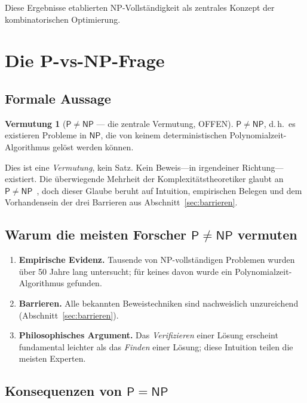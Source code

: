 \documentclass[12pt,a4paper]{amsart}
\theoremstyle{definition}
\newtheorem{conjecture}[theorem]{Vermutung}
\newcommand{\Pclass}{\mathsf{P}}
\newcommand{\NP}{\mathsf{NP}}
\begin{document}
Diese Ergebnisse etablierten NP-Vollständigkeit als zentrales Konzept der
kombinatorischen Optimierung.

\section{Die P-vs-NP-Frage}
\label{sec:pvsnp}

\subsection{Formale Aussage}

\begin{conjecture}[$\Pclass\neq\NP$ --- die zentrale Vermutung, OFFEN]
\label{verm:pvsnp}
$\Pclass \neq \NP$, d.\,h.\ es existieren Probleme in $\NP$, die von keinem
deterministischen Polynomialzeit-Algorithmus gelöst werden können.
\end{conjecture}

Dies ist eine \emph{Vermutung}, kein Satz.  Kein Beweis---in irgendeiner
Richtung---existiert.  Die überwiegende Mehrheit der Komplexitätstheoretiker
glaubt an $\Pclass\neq\NP$~\cite{gasarch2012}, doch dieser Glaube beruht auf
Intuition, empirischen Belegen und dem Vorhandensein der drei Barrieren aus
Abschnitt~\ref{sec:barrieren}.

\subsection{Warum die meisten Forscher $\Pclass\neq\NP$ vermuten}

\begin{enumerate}[label=(\alph*)]
  \item \textbf{Empirische Evidenz.}  Tausende von NP-vollständigen Problemen
    wurden über 50 Jahre lang untersucht; für keines davon wurde ein
    Polynomialzeit-Algorithmus gefunden.
  \item \textbf{Barrieren.}  Alle bekannten Beweistechniken sind nachweislich
    unzureichend (Abschnitt~\ref{sec:barrieren}).
  \item \textbf{Philosophisches Argument.}  Das \emph{Verifizieren} einer
    Lösung erscheint fundamental leichter als das \emph{Finden} einer Lösung;
    diese Intuition teilen die meisten Experten.
\end{enumerate}

\subsection{Konsequenzen von $\Pclass = \NP$}
\end{document}

